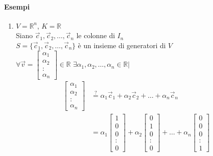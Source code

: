 \paragraph{Esempi} 
\begin{enumerate}
    \item $V=\mathbb{R}^n$, $K=\mathbb{R}$\\
        Siano $\vec{c}_1, \vec{c}_2,\dots, \vec{c}_n$  le colonne di $I_n$\\
        $S=\{\vec{c}_1, \vec{c}_2,\dots, \vec{c}_n\}$ è un insieme di generatori di $V$ \\
        $\forall \vec{v}= 
        \begin{bmatrix}
            \alpha_1\\\alpha_2\\:\\\alpha_n
        \end{bmatrix}
        \in\mathbb{R}
        $  $ 
        \exists\alpha_1, \alpha_2,\dots, \alpha_n \in\mathbb{R}|
        $
        \begin{align*}
            \begin{bmatrix}
                \alpha_1\\\alpha_2\\:\\\alpha_n
            \end{bmatrix}
            & \overset{?}{=}
            \alpha_1\vec{c}_1+
            \alpha_2\vec{c}_2+\dots+
            \alpha_n\vec{c}_n\\
            & =
            \alpha_1 
            \begin{bmatrix}
                1\\0\\0\\:\\0
            \end{bmatrix}+
            \alpha_2 
            \begin{bmatrix}
                0\\1\\0\\:\\0
            \end{bmatrix}+\dots+
            \alpha_n 
            \begin{bmatrix}
                0\\0\\0\\:\\1
            \end{bmatrix}

\end{align*}
\end{enumerate}
